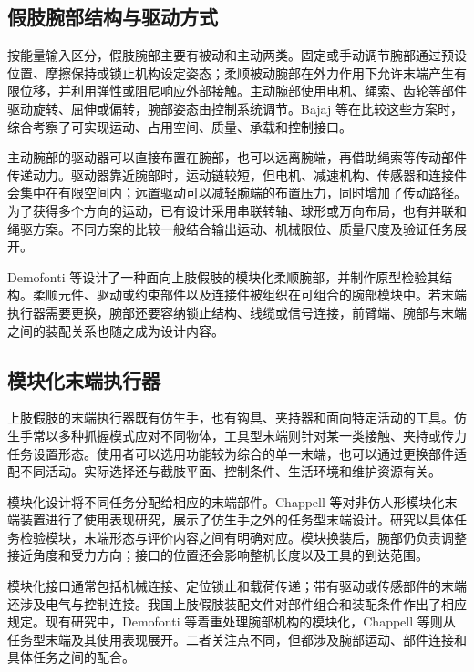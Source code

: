 \subsection{假肢腕部结构与驱动方式}

按能量输入区分，假肢腕部主要有被动和主动两类。固定或手动调节腕部通过预设位置、摩擦保持或锁止机构设定姿态；柔顺被动腕部在外力作用下允许末端产生有限位移，并利用弹性或阻尼响应外部接触。主动腕部使用电机、绳索、齿轮等部件驱动旋转、屈伸或偏转，腕部姿态由控制系统调节。Bajaj 等在比较这些方案时，综合考察了可实现运动、占用空间、质量、承载和控制接口\cite{Bajaj2019ArtificialWrists}。


主动腕部的驱动器可以直接布置在腕部，也可以远离腕端，再借助绳索等传动部件传递动力。驱动器靠近腕部时，运动链较短，但电机、减速机构、传感器和连接件会集中在有限空间内；远置驱动可以减轻腕端的布置压力，同时增加了传动路径。为了获得多个方向的运动，已有设计采用串联转轴、球形或万向布局，也有并联和绳驱方案。不同方案的比较一般结合输出运动、机械限位、质量尺度及验证任务展开\cite{Bajaj2019ArtificialWrists}。

Demofonti 等设计了一种面向上肢假肢的模块化柔顺腕部，并制作原型检验其结构\cite{Demofonti2023ModularWrist}。柔顺元件、驱动或约束部件以及连接件被组织在可组合的腕部模块中。若末端执行器需要更换，腕部还要容纳锁止结构、线缆或信号连接，前臂端、腕部与末端之间的装配关系也随之成为设计内容。

\subsection{模块化末端执行器}

上肢假肢的末端执行器既有仿生手，也有钩具、夹持器和面向特定活动的工具。仿生手常以多种抓握模式应对不同物体，工具型末端则针对某一类接触、夹持或传力任务设置形态。使用者可以选用功能较为综合的单一末端，也可以通过更换部件适配不同活动。实际选择还与截肢平面、控制条件、生活环境和维护资源有关\cite{Fink2023UpperExtremityProstheses}。

模块化设计将不同任务分配给相应的末端部件。Chappell 等对非仿人形模块化末端装置进行了使用表现研究，展示了仿生手之外的任务型末端设计\cite{Chappell2025ModularTerminalDevices}。研究以具体任务检验模块，末端形态与评价内容之间有明确对应。模块换装后，腕部仍负责调整接近角度和受力方向；接口的位置还会影响整机长度以及工具的到达范围。

模块化接口通常包括机械连接、定位锁止和载荷传递；带有驱动或传感部件的末端还涉及电气与控制连接。我国上肢假肢装配文件对部件组合和装配条件作出了相应规定\cite{GBZ409862021UpperLimbAssembly}。现有研究中，Demofonti 等着重处理腕部机构的模块化，Chappell 等则从任务型末端及其使用表现展开\cite{Demofonti2023ModularWrist,Chappell2025ModularTerminalDevices}。二者关注点不同，但都涉及腕部运动、部件连接和具体任务之间的配合。

